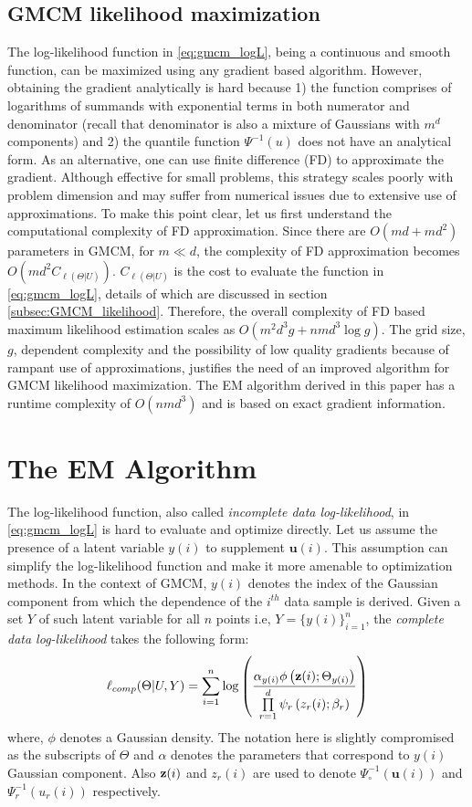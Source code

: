 \documentclass[]{article}
\begin{document}
 
 \subsection{GMCM likelihood maximization}\label{subsec:GMCM_maximization}
 The log-likelihood function in  \eqref{eq:gmcm_logL}, being a continuous and smooth function, can be maximized using any gradient based algorithm. However, obtaining the gradient analytically is hard because 1) the function comprises of logarithms of summands with exponential terms in both numerator and denominator (recall that denominator is also a mixture of Gaussians with $m^d$ components) and 2) the quantile function $\Psi^{-1}(u)$ does not have an analytical form. As an alternative, one can use finite difference (FD) to approximate the gradient. Although effective for small problems, this strategy scales poorly with problem dimension and may suffer from numerical issues due to extensive use of approximations. To make this point clear, let us first understand the computational complexity of FD approximation. Since there are $O(md+md^2)$ parameters in GMCM, for $m \ll d$, the complexity of FD approximation becomes $O(md^2C_{\ell(\Theta|U)})$.  $C_{\ell(\Theta|U)}$ is the cost to evaluate the function in  \eqref{eq:gmcm_logL}, details of which are discussed in section \ref{subsec:GMCM_likelihood}.  Therefore, the overall complexity of FD based maximum likelihood estimation scales as $O(m^2d^3g+nmd^3\log{g})$. The grid size, $g$, dependent complexity and the possibility of low quality gradients because of rampant use of approximations, justifies the need of an improved algorithm for GMCM likelihood maximization. The EM algorithm derived in this paper has  a runtime complexity of $O(nmd^3)$ and is based on exact gradient information.  

\section{The EM Algorithm}\label{sec:EM}
The log-likelihood function, also called \emph{incomplete data log-likelihood}, in \eqref{eq:gmcm_logL} is hard to evaluate and optimize directly. Let us assume the presence of a latent variable $y(i)$ to supplement $\textbf{u}(i)$. This assumption can simplify the log-likelihood function and make it more amenable to optimization methods. In the context of GMCM, $y(i)$ denotes the index of the Gaussian component from which the dependence of the $i^{th}$ data sample is derived. Given a set $Y$ of such latent variable for all $n$ points i.e, $Y=\{ y(i)\}_{i=1}^n$,
the \emph{complete data log-likelihood} takes the following form:
\begin{equation}\label{eq:gmcm_complelte_logL}
 \ell_{comp}(\Theta |U,Y)= \sum\limits_{i=1}^{n} \log \left( \frac{\alpha_{y(i)}\phi \left(\textbf{z}({i});\Theta_{y(i)} \right)}{\prod\limits_{r=1}^{d}\psi_{r}\left(z_r({i});\beta_r \right)} \right) 
 \end{equation}
where, $\phi$ denotes a Gaussian density. The notation here is slightly compromised as the subscripts of $\Theta$ and $\alpha$ denotes the parameters that correspond to $y(i)$ Gaussian component. Also $\textbf{z}({i})$ and $z_r(i)$ are used to denote $\Psi_{\circ}^{-1}\left(\textbf{u}(i)\right)$ and $ \Psi_r^{-1}(u_r(i))$ respectively.
\end{document}
